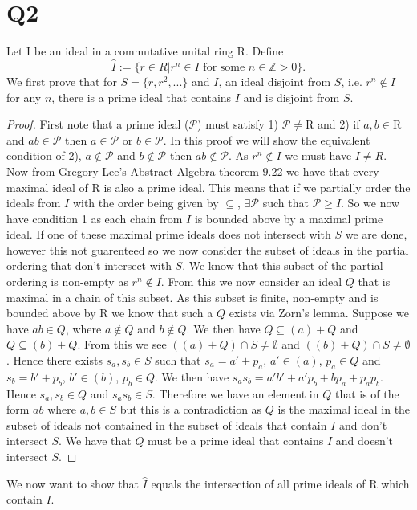 \documentclass{article}
\theoremstyle{definition}
\begin{document}
\section*{Q2}
Let I be an ideal in a commutative unital ring R. Define
$$\hat{I}:= \{r \in R | r^n\in I \text{ for some } n\in\mathbb{Z}>0\}.$$
We first prove that for $S=\{r,r^2,...\}$ and $I$, an ideal disjoint from $S$, i.e. $r^n\notin I$ for any $n$, there is a prime ideal that contains $I$ and is disjoint from $S$.
\begin{proof}
First note that a prime ideal ($\mathcal{P}$) must satisfy 1) $\mathcal{P}\neq$R and 2) if $a,b\in$R and $ab\in\mathcal{P}$ then $a\in\mathcal{P}$ or $b\in\mathcal{P}$. In this proof we will show the equivalent condition of 2),  $a\notin\mathcal{P}$ and $b\notin\mathcal{P}$ then $ab\notin\mathcal{P}$. As $r^n\notin I$ we must have $I\neq R$. Now from Gregory Lee's Abstract Algebra theorem 9.22 we have that every maximal ideal of R is also a prime ideal. This means that if we partially order the ideals from $I$ with the order being given by $\subseteq$, $\exists\mathcal{P}$ such that $\mathcal{P}\geq I$. So we now have condition 1 as each chain from $I$ is bounded above by a maximal prime ideal. If one of these maximal prime ideals does not intersect with $S$ we are done, however this not guarenteed so we now consider the subset of ideals in the partial ordering that don't intersect with $S$. We know that this subset of the partial ordering is non-empty as $r^n\notin I$. From this we now consider an ideal $Q$ that is maximal in a chain of this subset. As this subset is finite, non-empty and is bounded above by R we know that such a $Q$ exists via Zorn's lemma. Suppose we have $ab\in Q$, where $a\notin Q$ and $b\notin Q$. We then have $Q\subseteq (a)+Q$ and $Q\subseteq (b)+Q$. From this we see $((a)+Q)\cap S\neq\emptyset$ and $((b)+Q)\cap S\neq\emptyset$. Hence there exists $s_a,s_b\in S$ such that $s_a=a'+p_a$, $a'\in(a)$, $p_a\in Q$ and $s_b=b'+p_b$, $b'\in(b)$, $p_b\in Q$. We then have $s_as_b=a'b'+a'p_b+bp_a+p_ap_b$. Hence $s_a,s_b\in Q$ and $s_as_b\in S$. Therefore we have an element in $Q$ that is of the form $ab$ where $a,b\in S$ but this is a contradiction as $Q$ is the maximal ideal in the subset of ideals not contained in the subset of ideals that contain $I$ and don't intersect $S$. We have that $Q$ must be a prime ideal that contains $I$ and doesn't intersect $S$.
\end{proof}
\noindent We now want to show that $\hat{I}$ equals the intersection of all prime ideals of R which contain $I$.
\end{document}

